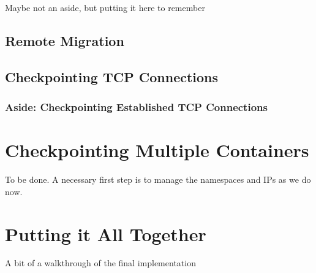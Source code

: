 Maybe not an aside, but putting it here to remember

\subsection{Remote Migration}

\subsection{Checkpointing TCP Connections}

\subsubsection*{Aside: Checkpointing Established TCP Connections}

\section{Checkpointing Multiple Containers}

To be done.
A necessary first step is to manage the namespaces and IPs as we do now.

\section{Putting it All Together}

A bit of a walkthrough of the final implementation
